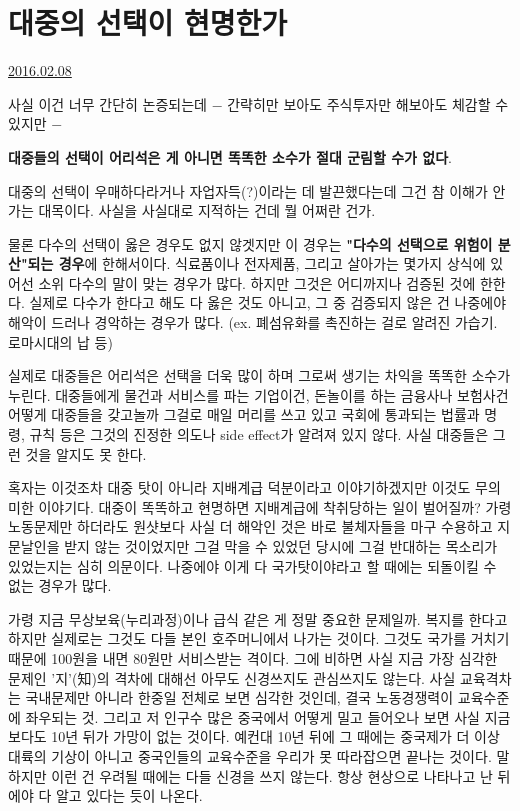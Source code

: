 \section{대중의 선택이 현명한가}
\href{https://www.kockoc.com/Apoc/628803}{2016.02.08}

\vspace{5mm}

사실 이건 너무 간단히 논증되는데
$-$ 간략히만 보아도 주식투자만 해보아도 체감할 수 있지만 $-$
\vspace{5mm}

\textbf{대중들의 선택이 어리석은 게 아니면 똑똑한 소수가 절대 군림할 수가 없다}.
\vspace{5mm}

대중의 선택이 우매하다라거나 자업자득(?)이라는 데 발끈했다는데 그건 참 이해가 안 가는 대목이다.
사실을 사실대로 지적하는 건데 뭘 어쩌란 건가.
\vspace{5mm}

물론 다수의 선택이 옳은 경우도 없지 않겟지만 이 경우는 \textbf{"다수의 선택으로 위험이 분산"되는 경우}에 한해서이다.
식료품이나 전자제품, 그리고 살아가는 몇가지 상식에 있어선 소위 다수의 말이 맞는 경우가 많다.
하지만 그것은 어디까지나 검증된 것에 한한다.
실제로 다수가 한다고 해도 다 옳은 것도 아니고, 그 중 검증되지 않은 건 나중에야 해악이 드러나 경악하는 경우가 많다.
(ex. 폐섬유화를 촉진하는 걸로 알려진 가습기. 로마시대의 납 등)
\vspace{5mm}

실제로 대중들은 어리석은 선택을 더욱 많이 하며 그로써 생기는 차익을 똑똑한 소수가 누린다.
대중들에게 물건과 서비스를 파는 기업이건, 돈놀이를 하는 금융사나 보험사건 어떻게 대중들을 갖고놀까 그걸로 매일 머리를 쓰고 있고
국회에 통과되는 법률과 명령, 규칙 등은 그것의 진정한 의도나 side effect가 알려져 있지 않다. 사실 대중들은 그런 것을 알지도 못 한다.
\vspace{5mm}

혹자는 이것조차 대중 탓이 아니라 지배계급 덕분이라고 이야기하겠지만
이것도 무의미한 이야기다. 대중이 똑똑하고 현명하면 지배계급에 착취당하는 일이 벌어질까?
가령 노동문제만 하더라도 원샷보다 사실 더 해악인 것은 바로 불체자들을 마구 수용하고 지문날인을 받지 않는 것이었지만
그걸 막을 수 있었던 당시에 그걸 반대하는 목소리가 있었는지는 심히 의문이다.
나중에야 이게 다 국가탓이야라고 할 때에는 되돌이킬 수 없는 경우가 많다.
\vspace{5mm}

가령 지금 무상보육(누리과정)이나 급식 같은 게 정말 중요한 문제일까.
복지를 한다고 하지만 실제로는 그것도 다들 본인 호주머니에서 나가는 것이다.
그것도 국가를 거치기 때문에 100원을 내면 80원만 서비스받는 격이다.
그에 비하면 사실 지금 가장 심각한 문제인 '지'(知)의 격차에 대해선 아무도 신경쓰지도 관심쓰지도 않는다.
사실 교육격차는 국내문제만 아니라 한중일 전체로 보면 심각한 것인데, 결국 노동경쟁력이 교육수준에 좌우되는 것.
그리고 저 인구수 많은 중국에서 어떻게 밀고 들어오나 보면 사실 지금보다도 10년 뒤가 가망이 없는 것이다.
예컨대 10년 뒤에 그 때에는 중국제가 더 이상 대륙의 기상이 아니고 중국인들의 교육수준을 우리가 못 따라잡으면 끝나는 것이다.
말하지만 이런 건 우려될 때에는 다들 신경을 쓰지 않는다. 항상 현상으로 나타나고 난 뒤에야 다 알고 있다는 듯이 나온다.
\vspace{5mm}

